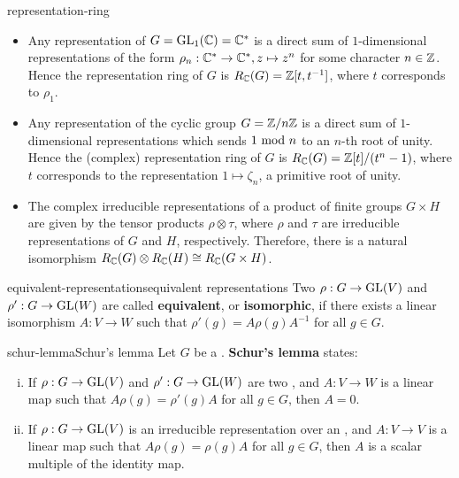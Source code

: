 \begin{example}{representation-ring}
    \begin{itemize}
        \item Any representation of $G = \textup{GL}_1(\mathbb{C}) = \mathbb{C}^*$ is a direct sum of $1$-dimensional representations of the form $\rho_n : \mathbb{C}^* \to \mathbb{C}^*, z \mapsto z^n$ for some character $n \in \mathbb{Z}$. Hence the representation ring of $G$ is $R_{\mathbb{C}}(G) = \mathbb{Z}[t, t^{-1}]$, where $t$ corresponds to $\rho_1$.
        
        \item Any representation of the cyclic group $G = \mathbb{Z}/n\mathbb{Z}$ is a direct sum of $1$-dimensional representations which sends $1 \textup{ mod } n$ to an $n$-th root of unity. Hence the (complex) representation ring of $G$ is $R_{\mathbb{C}}(G) = \mathbb{Z}[t]/(t^n - 1)$, where $t$ corresponds to the representation $1 \mapsto \zeta_n$, a primitive root of unity.
        
        \item The complex irreducible representations of a product of finite groups $G \times H$ are given by the tensor products $\rho \otimes \tau$, where $\rho$ and $\tau$ are irreducible representations of $G$ and $H$, respectively. Therefore, there is a natural isomorphism $R_{\mathbb{C}}(G) \otimes R_{\mathbb{C}}(H) \cong R_{\mathbb{C}}(G \times H)$.
    \end{itemize}
\end{example}

\begin{topic}{equivalent-representations}{equivalent representations}
    Two  $\rho : G \to \textup{GL}(V)$ and $\rho' : G \to \textup{GL}(W)$ are called \textbf{equivalent}, or \textbf{isomorphic}, if there exists a linear isomorphism $A : V \to W$ such that $\rho'(g) = A \rho(g) A^{-1}$ for all $g \in G$.
\end{topic}

\begin{topic}{schur-lemma}{Schur's lemma}
    Let $G$ be a . \textbf{Schur's lemma} states:
    \begin{enumerate}[(i)]
        \item If $\rho : G \to \textup{GL}(V)$ and $\rho' : G \to \textup{GL}(W)$ are two   , and $A : V \to W$ is a linear map such that $A \rho(g) = \rho'(g) A$ for all $g \in G$, then $A = 0$.
        \item If $\rho : G \to \textup{GL}(V)$ is an irreducible representation over an , and $A : V \to V$ is a linear map such that $A \rho(g) = \rho(g) A$ for all $g \in G$, then $A$ is a scalar multiple of the identity map.
    \end{enumerate}
\end{topic}

